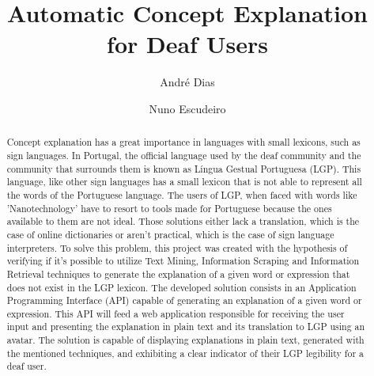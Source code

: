 \documentclass[runningheads]{llncs}
\begin{document}
%
\title{Automatic Concept Explanation for Deaf Users}
%
%
\author{André Dias \and
Nuno Escudeiro}
%
%
%
\maketitle              %
%
\begin{abstract}
    Concept explanation has a great importance in languages with small lexicons, such as sign languages.
    In Portugal, the official language used by the deaf community and the community that surrounds them is known as Língua Gestual Portuguesa (LGP).
    This language, like other sign languages has a small lexicon that is not able to represent all the words of the Portuguese language.
    The users of LGP, when faced with words like 'Nanotechnology' have to resort to tools made for Portuguese because the ones available to them are not ideal.
    Those solutions either lack a translation, which is the case of online dictionaries or aren't practical, which is the case of sign language interpreters.
    To solve this problem, this project was created with the hypothesis of verifying if it's possible to utilize Text Mining, Information Scraping and Information Retrieval techniques to generate the explanation of a given word or expression that does not exist in the LGP lexicon.
    The developed solution consists in an Application Programming Interface (API) capable of generating an explanation of a given word or expression.
    This API will feed a web application responsible for receiving the user input and presenting the explanation in plain text and its translation to LGP using an avatar.
    The solution is capable of displaying explanations in plain text, generated with the mentioned techniques, and exhibiting a clear indicator of their LGP legibility for a deaf user.

\end{abstract}
%
%
%
\end{document}
